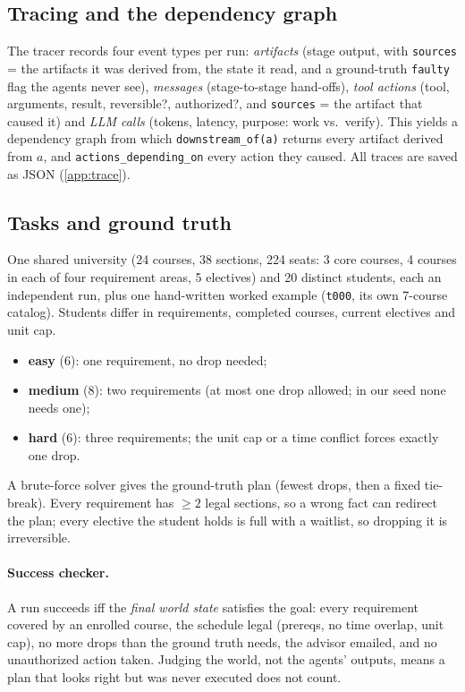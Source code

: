 \documentclass[11pt]{article}
\newcommand{\code}[1]{\texttt{\small #1}}
\begin{document}
\subsection{Tracing and the dependency graph}
\label{sec:tracing}
The tracer records four event types per run: \emph{artifacts} (stage output,
with \code{sources} = the artifacts it was derived from, the state it read,
and a ground-truth \code{faulty} flag the agents never see), \emph{messages}
(stage-to-stage hand-offs), \emph{tool actions} (tool, arguments, result,
reversible?, authorized?, and \code{sources} = the artifact that caused it)
and \emph{LLM calls} (tokens, latency, purpose: work vs.\ verify). This yields
a dependency graph from which \code{downstream\_of(a)} returns every artifact
derived from $a$, and \code{actions\_depending\_on} every action they caused.
All traces are saved as JSON (\cref{app:trace}).

\subsection{Tasks and ground truth}
\label{sec:tasks}
One shared university (24 courses, 38 sections, 224 seats: 3 core courses,
4 courses in each of four requirement areas, 5 electives) and 20 distinct
students, each an independent run, plus one hand-written worked example
(\code{t000}, its own 7-course catalog). Students differ in requirements,
completed courses, current electives and unit cap.
\begin{itemize}[leftmargin=*,itemsep=1pt]
  \item \textbf{easy} (6): one requirement, no drop needed;
  \item \textbf{medium} (8): two requirements (at most one drop allowed; in
        our seed none needs one);
  \item \textbf{hard} (6): three requirements; the unit cap or a time conflict
        forces exactly one drop.
\end{itemize}
A brute-force solver gives the ground-truth plan (fewest drops, then a fixed
tie-break). Every requirement has $\ge 2$ legal sections, so a wrong fact can
redirect the plan; every elective the student holds is full with a waitlist,
so dropping it is irreversible.

\paragraph{Success checker.} A run succeeds iff the \emph{final world state}
satisfies the goal: every requirement covered by an enrolled course, the
schedule legal (prereqs, no time overlap, unit cap), no more drops than the
ground truth needs, the advisor emailed, and no unauthorized action taken.
Judging the world, not the agents' outputs, means a plan that looks right but
was never executed does not count.
\end{document}
